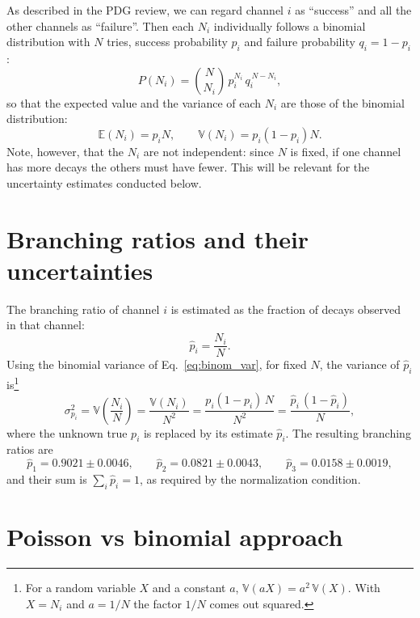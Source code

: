 \documentclass[11pt,a4paper]{article}
\begin{document}
	As described in the PDG review, we can regard channel $i$ as ``success'' and all the other channels as ``failure''.
	Then each $N_i$ individually follows a binomial distribution with $N$ tries, success probability $p_i$ and failure probability $q_i = 1 - p_i$:
	\begin{equation}
		P(N_i) = \binom{N}{N_i}\, p_i^{N_i}\, q_i^{\,N - N_i} ,
	\end{equation}
	so that the expected value and the variance of each $N_i$ are those of the binomial distribution:
	\begin{equation}
		\mathbb{E}(N_i) = p_i N, \qquad \mathbb{V}(N_i) = p_i (1 - p_i) N .
		\label{eq:binom_var}
	\end{equation}
	Note, however, that the $N_i$ are not independent: since $N$ is fixed, if one channel has more decays the others must have fewer.
	This will be relevant for the uncertainty estimates conducted below.
	
	\section*{Branching ratios and their uncertainties}
	
	The branching ratio of channel $i$ is estimated as the fraction of decays observed in that channel:
	\begin{equation}
		\hat{p}_i = \frac{N_i}{N} .
	\end{equation}
	Using the binomial variance of Eq.~\eqref{eq:binom_var}, for fixed $N$, the variance of $\hat{p}_i$ is\footnote{For a random variable $X$ and a constant $a$, $\mathbb{V}(aX) = a^2\,\mathbb{V}(X)$.
		With $X = N_i$ and $a = 1/N$ the factor $1/N$ comes out squared.}
	\begin{equation}
		\sigma^2_{p_i} = \mathbb{V}\!\left(\frac{N_i}{N}\right) = \frac{\mathbb{V}(N_i)}{N^2} = \frac{p_i(1-p_i)\,N}{N^2} = \frac{\hat{p}_i\,(1-\hat{p}_i)}{N},
		\label{eq:sigma}
	\end{equation}
	where the unknown true $p_i$ is replaced by its estimate $\hat{p}_i$.
	The resulting branching ratios are
	\begin{equation}
		\hat{p}_1 = 0.9021 \pm 0.0046, \qquad \hat{p}_2 = 0.0821 \pm 0.0043, \qquad \hat{p}_3 = 0.0158 \pm 0.0019,
	\end{equation}
	and their sum is $\sum_i \hat{p}_i = 1$, as required by the normalization condition.
	
	\section*{Poisson vs binomial approach}
	
\end{document}
